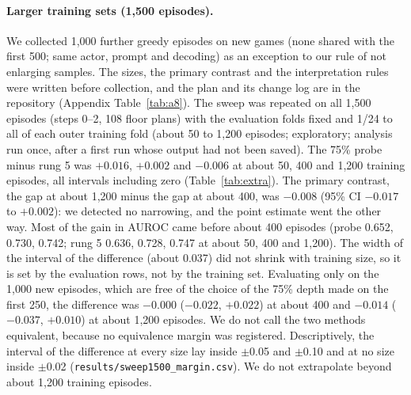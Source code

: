 \documentclass[11pt]{article}
\begin{document}
\paragraph{Larger training sets (1,500 episodes).} We collected 1,000 further greedy episodes on new games (none shared with the first 500; same actor, prompt and decoding) as an exception to our rule of not enlarging samples. The sizes, the primary contrast and the interpretation rules were written before collection, and the plan and its change log are in the repository (Appendix Table~\ref{tab:a8}). The sweep was repeated on all 1,500 episodes (steps 0--2, 108 floor plans) with the evaluation folds fixed and 1/24 to all of each outer training fold (about 50 to 1,200 episodes; exploratory; analysis run once, after a first run whose output had not been saved). The 75\% probe minus rung 5 was $+0.016$, $+0.002$ and $-0.006$ at about 50, 400 and 1,200 training episodes, all intervals including zero (Table~\ref{tab:extra}). The primary contrast, the gap at about 1,200 minus the gap at about 400, was $-0.008$ (95\% CI $-0.017$ to $+0.002$): we detected no narrowing, and the point estimate went the other way. Most of the gain in AUROC came before about 400 episodes (probe 0.652, 0.730, 0.742; rung 5 0.636, 0.728, 0.747 at about 50, 400 and 1,200). The width of the interval of the difference (about 0.037) did not shrink with training size, so it is set by the evaluation rows, not by the training set. Evaluating only on the 1,000 new episodes, which are free of the choice of the 75\% depth made on the first 250, the difference was $-0.000$ ($-0.022$, $+0.022$) at about 400 and $-0.014$ ($-0.037$, $+0.010$) at about 1,200 episodes. We do not call the two methods equivalent, because no equivalence margin was registered. Descriptively, the interval of the difference at every size lay inside $\pm$0.05 and $\pm$0.10 and at no size inside $\pm$0.02 (\texttt{results/sweep1500\_margin.csv}). We do not extrapolate beyond about 1,200 training episodes.
\end{document}
